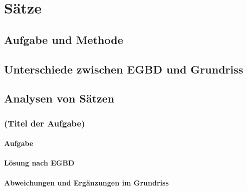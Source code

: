 \chapter{Sätze}
\label{sec:saetze}

\section{Aufgabe und Methode}
\label{sec:saetze:aufgabeundmethoden}

\section{Unterschiede zwischen EGBD und Grundriss}
\label{sec:saetze:unterschiedezwischenegbdundgrundriss}

\section{Analysen von Sätzen}
\label{sec:saetze:analysenvonsaetzen}

\subsection{(Titel der Aufgabe)}

\subsubsection{Aufgabe}

\subsubsection{Lösung nach EGBD}

\subsubsection{Abweichungen und Ergänzungen im Grundriss}


